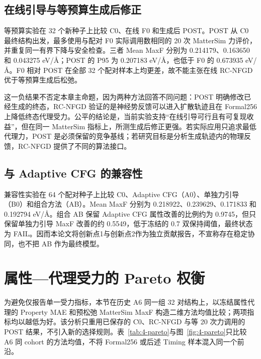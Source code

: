 \subsection{在线引导与等预算生成后修正}

等预算实验在 32 个新种子上比较 C0、在线 F0 和生成后 POST。POST 从 C0 最终结构出发，最多使用与配对 F0 实际调用数相同的 20 次 Matter\allowbreak Sim 力评价，并重复同一有界下降与安全检查。三者 Mean MaxF 分别为 0.214179、0.163650 和 0.043275 eV/Å；POST 的 P95 为 0.207183 eV/Å，也低于 F0 的 0.673935 eV/Å。F0 相对 POST 在全部 32 个配对样本上均更差，故不能主张在线 RC-NFGD 优于等预算生成后松弛。

这一负结果不否定本章主命题，因为两种方法回答不同问题：POST 明确修改已经生成的终态，RC-NFGD 验证的是神经势反馈可以进入扩散轨迹且在 Formal256 上降低终态代理受力。公平的结论是，当前实验支持``在线引导可行且有可复现收益''，但在同一 Matter\allowbreak Sim 指标上，所测生成后修正更强。若实际应用只追求最低代理力，POST 是必须保留的竞争基线；若研究目标是分析生成轨迹内的物理反馈，RC-NFGD 提供了不同的算法接口。

\subsection{与 Adaptive CFG 的兼容性}

兼容性实验在 64 个配对种子上比较 C0、Adaptive CFG（A0）、单独力引导（B0）和组合方法（AB）。Mean MaxF 分别为 0.218922、0.239629、0.171833 和 0.192794 eV/Å。组合 AB 保留 Adaptive CFG 属性改善的比例约为 0.9745，但只保留单独力引导 MaxF 改善的约 0.5549，低于冻结的 0.7 双保持阈值，最终状态为 FAIL。因而本论文将创新点1与创新点2作为独立贡献报告，不宣称存在稳定协同，也不把 AB 作为最终模型。

\section{属性---代理受力的 Pareto 权衡}

为避免仅报告单一受力指标，本节在历史 A6 同一组 32 对结构上，以冻结属性代理的 Property MAE 和预松弛 Matter\allowbreak Sim MaxF 构造二维方法均值比较；两项指标均以越低为好。该分析只重用已保存的 C0、RC-NFGD 与等 20 次力调用的 POST 结果，不引入新的选择规则。表~\ref{tab:4-pareto}与图~\ref{fig:4-pareto}只比较 A6 同 cohort 的方法均值，不将 Formal256 或后述 Timing 样本混入同一个前沿。

